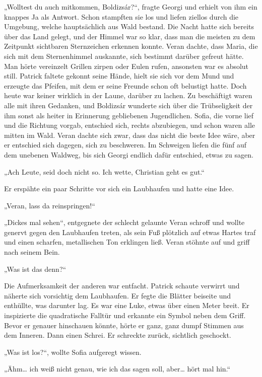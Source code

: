 \documentclass[oneside]{memoir}
\begin{document}
„Wolltest du auch mitkommen, Boldizsár?“, fragte Georgi und erhielt von ihm ein knappes Ja als Antwort. Schon stampften sie los und liefen ziellos durch die Umgebung, welche hauptsächlich aus Wald bestand. Die Nacht hatte sich bereits über das Land gelegt, und der Himmel war so klar, dass man die meisten zu dem Zeitpunkt sichtbaren Sternzeichen erkennen konnte. Veran dachte, dass Maria, die sich mit dem Sternenhimmel auskannte, sich bestimmt darüber gefreut hätte. Man hörte vereinzelt Grillen zirpen oder Eulen rufen, ansonsten war es absolut still. Patrick faltete gekonnt seine Hände, hielt sie sich vor dem Mund und erzeugte das Pfeifen, mit dem er seine Freunde schon oft belustigt hatte. Doch heute war keiner wirklich in der Laune, darüber zu lachen. Zu beschäftigt waren alle mit ihren Gedanken, und Boldizsár wunderte sich über die Trübseligkeit der ihm sonst als heiter in Erinnerung gebliebenen Jugendlichen. Sofia, die vorne lief und die Richtung vorgab, entschied sich, rechts abzubiegen, und schon waren alle mitten im Wald. Veran dachte sich zwar, dass das nicht die beste Idee wäre, aber er entschied sich dagegen, sich zu beschweren. Im Schweigen liefen die fünf auf dem unebenen Waldweg, bis sich Georgi endlich dafür entschied, etwas zu sagen.

„Ach Leute, seid doch nicht so. Ich wette, Christian geht es gut.“

Er erspähte ein paar Schritte vor sich ein Laubhaufen und hatte eine Idee.

„Veran, lass da reinspringen!“

„Dickes mal sehen“, entgegnete der schlecht gelaunte Veran schroff und wollte genervt gegen den Laubhaufen treten, als sein Fuß plötzlich auf etwas Hartes traf und einen scharfen, metallischen Ton erklingen ließ.
Veran stöhnte auf und griff nach seinem Bein.

„Was ist das denn?“

Die Aufmerksamkeit der anderen war entfacht. Patrick schaute verwirrt und näherte sich vorsichtig dem Laubhaufen. Er fegte die Blätter beiseite und enthüllte, was darunter lag. Es war eine Luke, etwas über einen Meter breit. Er inspizierte die quadratische Falltür und erkannte ein Symbol neben dem Griff. Bevor er genauer hinschauen könnte, hörte er ganz, ganz dumpf Stimmen aus dem Inneren. Dann einen Schrei. Er schreckte zurück, sichtlich geschockt.

„Was ist los?“, wollte Sofia aufgeregt wissen.

„Ähm\ldots{} ich weiß nicht genau, wie ich das sagen soll, aber\ldots{} hört mal hin.“
\end{document}
